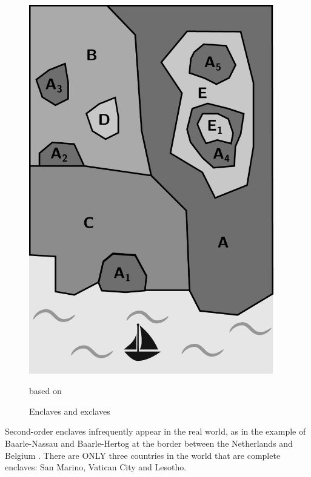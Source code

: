 \begin{minipage}[t]{0.34\textwidth}

\vspace{-2em}
\begin{figure}[H]
  \centering
  \includegraphics[width=0.95\textwidth]{graphics/basics/countries/enclaves_exclaves}
  \caption{Enclaves and exclaves}
  \small{based on \cite{enclavesexclavesfigure}}
  \label{fig:enclaves_exclaves}
\end{figure}

\end{minipage}    %

Second-order enclaves infrequently appear in the real world, as in the example of Baarle-Nassau and Baarle-Hertog at the border between the Netherlands and Belgium \cite{baarlebaarle}. There are ONLY three countries in the world that are complete enclaves: San Marino, Vatican City and Lesotho.

